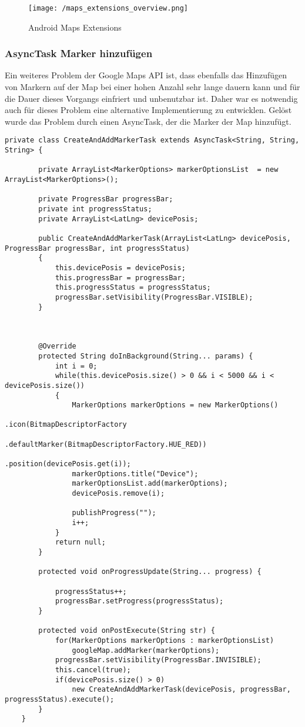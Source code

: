 \begin{figure}[H]
\centering
\texttt{[image: /maps\_extensions\_overview.png]}
\caption[User Interface: Android Maps Extensions]{Android Maps Extensions}
\label{fig:mapsExtensions}
\end{figure}

\subsubsection{AsyncTask Marker hinzufügen}

Ein weiteres Problem der Google Maps API ist, dass ebenfalls das Hinzufügen von Markern auf der Map bei einer hohen Anzahl sehr lange dauern kann und für die Dauer dieses Vorgangs einfriert und unbenutzbar ist. Daher war es notwendig auch für dieses Problem eine alternative Implementierung zu entwicklen. Gelöst wurde das Problem durch einen AsyncTask, der die Marker der Map hinzufügt.

\begin{lstlisting}[caption={"Asynchrones hinzufügen von Markern"},label=lst:asyncAddMarker, basicstyle=\footnotesize]
	private class CreateAndAddMarkerTask extends AsyncTask<String, String, String> {

		private ArrayList<MarkerOptions> markerOptionsList  = new ArrayList<MarkerOptions>();
		
		private ProgressBar progressBar;
		private int progressStatus;
		private ArrayList<LatLng> devicePosis;
		
		public CreateAndAddMarkerTask(ArrayList<LatLng> devicePosis, ProgressBar progressBar, int progressStatus)
		{
			this.devicePosis = devicePosis;
			this.progressBar = progressBar;
			this.progressStatus = progressStatus; 
			progressBar.setVisibility(ProgressBar.VISIBLE);
		}
		
		
		
		@Override
		protected String doInBackground(String... params) {
			int i = 0;
			while(this.devicePosis.size() > 0 && i < 5000 && i < devicePosis.size())
		    {				
			    MarkerOptions markerOptions = new MarkerOptions()
			    									.icon(BitmapDescriptorFactory
			    									.defaultMarker(BitmapDescriptorFactory.HUE_RED))
			    									.position(devicePosis.get(i));
			    markerOptions.title("Device");
			    markerOptionsList.add(markerOptions);
			    devicePosis.remove(i);

			    publishProgress(""); 
			    i++;
		    }
			return null;
		}
		
		protected void onProgressUpdate(String... progress) {
			
			progressStatus++;
			progressBar.setProgress(progressStatus);
		}
		
		protected void onPostExecute(String str) {
			for(MarkerOptions markerOptions : markerOptionsList)
	        	googleMap.addMarker(markerOptions);
			progressBar.setVisibility(ProgressBar.INVISIBLE);
			this.cancel(true);
			if(devicePosis.size() > 0)
				new CreateAndAddMarkerTask(devicePosis, progressBar, progressStatus).execute();
	    }
	}
\end{lstlisting}

